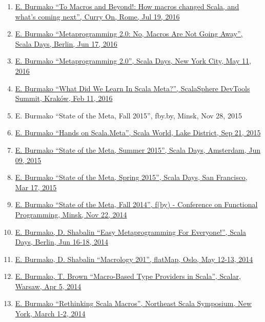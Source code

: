\documentclass[margin, 10pt]{Stylesheet}
\begin{document}
\begin{resume}
\begin{enumerate}
\item \href{http://scalamacros.org/paperstalks/2016-07-19-ToMacrosAndBeyond.pdf}{E. Burmako ``To Macros and Beyond!: How macros changed Scala, and what's coming next'', Curry On, Rome, Jul 19, 2016}
\item \href{http://scalamacros.org/paperstalks/2016-06-17-Metaprogramming20.pdf}{E. Burmako ``Metaprogramming 2.0: No, Macros Are Not Going Away'', Scala Days, Berlin, Jun 17, 2016}
\item \href{http://scalamacros.org/paperstalks/2016-05-11-Metaprogramming20.pdf}{E. Burmako ``Metaprogramming 2.0'', Scala Days, New York City, May 11, 2016}
\item \href{http://scalamacros.org/paperstalks/2016-02-11-WhatDidWeLearnInScalaMeta.pdf}{E. Burmako ``What Did We Learn In Scala Meta?'', ScalaSphere DevTools Summit, Krak\'{o}w, Feb 11, 2016}
\item E. Burmako ``State of the Meta, Fall 2015'', fby.by, Minsk, Nov 28, 2015
\item \href{https://github.com/scalameta/tutorial}{E. Burmako ``Hands on Scala.Meta'', Scala World, Lake District, Sep 21, 2015}
\item \href{http://scalamacros.org/paperstalks/2015-06-09-StateOfTheMetaSummer2015.pdf}{E. Burmako ``State of the Meta, Summer 2015'', Scala Days, Amsterdam, Jun 09, 2015}
\item \href{http://scalamacros.org/paperstalks/2015-03-17-StateOfTheMetaSpring2015.pdf}{E. Burmako ``State of the Meta, Spring 2015'', Scala Days, San Francisco, Mar 17, 2015}
\item \href{http://scalamacros.org/paperstalks/2014-11-22-TheStateOfTheMeta.pdf}{E. Burmako ``State of the Meta, Fall 2014'', f(by) - Conference on Functional Programming, Minsk, Nov 22, 2014}
\item \href{http://scalamacros.org/paperstalks/2014-06-17-EasyMetaprogrammingForEveryone.pdf}{E. Burmako, D. Shabalin ``Easy Metaprogramming For Everyone!'', Scala Days, Berlin, Jun 16-18, 2014}
\item \href{https://github.com/scalamacros/macrology201}{E. Burmako, D. Shabalin ``Macrology 201'', flatMap, Oslo, May 12-13, 2014}
\item \href{https://github.com/travisbrown/type-provider-examples/blob/master/docs/scalar-2014-slides.pdf?raw=true}{E. Burmako, T. Brown ``Macro-Based Type Providers in Scala'', Scalar, Warsaw, Apr 5, 2014}
\item \href{http://scalamacros.org/paperstalks/2014-03-02-RethinkingScalaMacros.pdf}{E. Burmako ``Rethinking Scala Macros'', Northeast Scala Symposium, New York, March 1-2, 2014}

\end{enumerate}
\end{resume}
\end{document}
